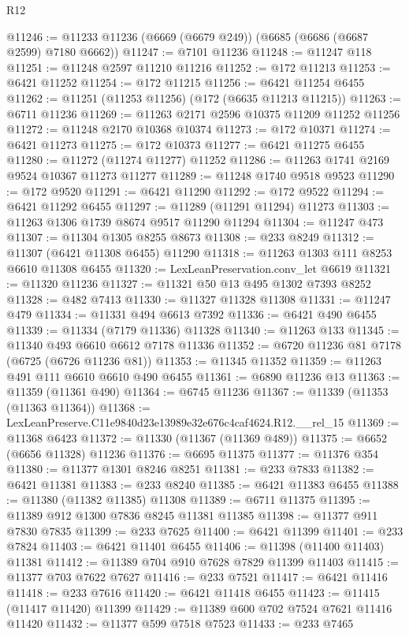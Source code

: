 \begin{lexlean}{R12}
\begin{coremodule}
@11246 := @11233 @11236 (@6669 (@6679 @249)) (@6685 (@6686 (@6687 @2599) @7180 @6662))
@11247 := @7101 @11236
@11248 := @11247 @118
@11251 := @11248 @2597 @11210 @11216
@11252 := @172 @11213
@11253 := @6421 @11252
@11254 := @172 @11215
@11256 := @6421 @11254 @6455
@11262 := @11251 (@11253 @11256) (@172 (@6635 @11213 @11215))
@11263 := @6711 @11236
@11269 := @11263 @2171 @2596 @10375 @11209 @11252 @11256
@11272 := @11248 @2170 @10368 @10374
@11273 := @172 @10371
@11274 := @6421 @11273
@11275 := @172 @10373
@11277 := @6421 @11275 @6455
@11280 := @11272 (@11274 @11277) @11252
@11286 := @11263 @1741 @2169 @9524 @10367 @11273 @11277
@11289 := @11248 @1740 @9518 @9523
@11290 := @172 @9520
@11291 := @6421 @11290
@11292 := @172 @9522
@11294 := @6421 @11292 @6455
@11297 := @11289 (@11291 @11294) @11273
@11303 := @11263 @1306 @1739 @8674 @9517 @11290 @11294
@11304 := @11247 @473
@11307 := @11304 @1305 @8255 @8673
@11308 := @233 @8249
@11312 := @11307 (@6421 @11308 @6455) @11290
@11318 := @11263 @1303 @111 @8253 @6610 @11308 @6455
@11320 := LexLeanPreservation.conv_let @6619
@11321 := @11320 @11236
@11327 := @11321 @50 @13 @495 @1302 @7393 @8252
@11328 := @482 @7413
@11330 := @11327 @11328 @11308
@11331 := @11247 @479
@11334 := @11331 @494 @6613 @7392
@11336 := @6421 @490 @6455
@11339 := @11334 (@7179 @11336) @11328
@11340 := @11263 @133
@11345 := @11340 @493 @6610 @6612 @7178 @11336
@11352 := @6720 @11236 @81 @7178 (@6725 (@6726 @11236 @81))
@11353 := @11345 @11352
@11359 := @11263 @491 @111 @6610 @6610 @490 @6455
@11361 := @6890 @11236 @13
@11363 := @11359 (@11361 @490)
@11364 := @6745 @11236
@11367 := @11339 (@11353 (@11363 @11364))
@11368 := LexLeanPreserve.C11e9840d23e13989e32e676c4caf4624.R12.__rel_15
@11369 := @11368 @6423
@11372 := @11330 (@11367 (@11369 @489))
@11375 := @6652 (@6656 @11328) @11236
@11376 := @6695 @11375
@11377 := @11376 @354
@11380 := @11377 @1301 @8246 @8251
@11381 := @233 @7833
@11382 := @6421 @11381
@11383 := @233 @8240
@11385 := @6421 @11383 @6455
@11388 := @11380 (@11382 @11385) @11308
@11389 := @6711 @11375
@11395 := @11389 @912 @1300 @7836 @8245 @11381 @11385
@11398 := @11377 @911 @7830 @7835
@11399 := @233 @7625
@11400 := @6421 @11399
@11401 := @233 @7824
@11403 := @6421 @11401 @6455
@11406 := @11398 (@11400 @11403) @11381
@11412 := @11389 @704 @910 @7628 @7829 @11399 @11403
@11415 := @11377 @703 @7622 @7627
@11416 := @233 @7521
@11417 := @6421 @11416
@11418 := @233 @7616
@11420 := @6421 @11418 @6455
@11423 := @11415 (@11417 @11420) @11399
@11429 := @11389 @600 @702 @7524 @7621 @11416 @11420
@11432 := @11377 @599 @7518 @7523
@11433 := @233 @7465

\end{coremodule}
\end{lexlean}
